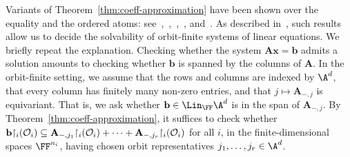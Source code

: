 Variants of Theorem~\ref{thm:coeff-approximation} have been shown over the equality and the ordered atoms: 
see~\cite[Cor.~3.17]{Gray97},~\cite[Thm.~15]{HofmanLerouxTotzke_17},~\cite[Thm.~3.4]{HofmanRozycki_2022},~\cite[Sec.~6]{GhoshHofmanLasota_22}, and~\cite[Thm.~19]{Arka_notes}.
As described in~\cite[Sec.~9]{GhoshLasota_24}, such results allow us to decide the solvability of orbit-finite systems of linear equations. 
We briefly repeat the explanation.
Checking whether the system $\mathbf{A} \mathbf{x} = \mathbf{b}$ admits a solution amounts to checking whether $\mathbf{b}$ is spanned by the columns of $\mathbf{A}$.
\color{magenta}In the orbit-finite setting, we assume that the rows and columns are indexed by $\A^d$, that every column has finitely many non-zero entries, and that $j \mapsto \mathbf{A}_{-, j}$ is equivariant.
That is, we ask whether $\mathbf{b} \in \Lin_\FF \A^d$ is in the span of $\mathbf{A}_{-, j}$. 
By Theorem~\ref{thm:coeff-approximation}, it suffices to check whether $\mathbf{b} {\restriction_i} (\cal O_i) \subseteq \mathbf{A}_{-, j_1} {\restriction_i} (\cal O_i) + \cdots + \mathbf{A}_{-, j_r} {\restriction_i} (\cal O_i)$ for all $i$, in the finite-dimensional spaces $\FF^{n_i}$, having chosen orbit representatives $j_1, \dots, j_r \in \A^d$.
\color{black}